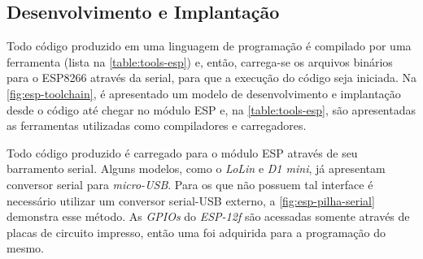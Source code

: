 \subsection{Desenvolvimento e Implantação}
\label{subsec:dev-esp}

Todo código produzido em uma linguagem de programação é compilado por uma
ferramenta (lista na \autoref{table:tools-esp}) e, então, carrega-se os arquivos binários para o ESP8266 através da
serial, para que a execução do código seja iniciada. Na
\autoref{fig:esp-toolchain}, é apresentado um modelo de desenvolvimento e
implantação desde o código até chegar no módulo ESP e, na \autoref{table:tools-esp},
são apresentadas as ferramentas utilizadas como compiladores e carregadores.

\begin{table}[htb]
\end{table}

Todo código produzido é carregado para o módulo ESP através de seu barramento
serial. Alguns modelos, como o \emph{LoLin} e \emph{D1 mini}, já apresentam
conversor serial para \emph{micro-USB}. Para os que não possuem tal interface é
necessário utilizar um conversor serial-USB externo, a
\autoref{fig:esp-pilha-serial} demonstra esse método. As \emph{GPIOs} do \emph{ESP-12f}
são acessadas somente através de placas
de circuito impresso, então uma foi adquirida para a programação do mesmo.

